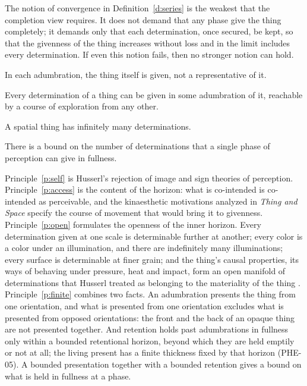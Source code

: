 \documentclass{situationist-preprint}
\begin{document}
The notion of convergence in Definition~\ref{d:series} is the weakest that the completion view requires. It does not demand that any phase give the thing completely; it demands only that each determination, once secured, be kept, so that the givenness of the thing increases without loss and in the limit includes every determination. If even this notion fails, then no stronger notion can hold.

\begin{principle}\label{p:self}
In each adumbration, the thing itself is given, not a representative of it.
\end{principle}

\begin{principle}\label{p:access}
Every determination of a thing can be given in some adumbration of it, reachable by a course of exploration from any other.
\end{principle}

\begin{principle}\label{p:open}
A spatial thing has infinitely many determinations.
\end{principle}

\begin{principle}\label{p:finite}
There is a bound on the number of determinations that a single phase of perception can give in fullness.
\end{principle}

Principle~\ref{p:self} is Husserl's rejection of image and sign theories of perception. Principle~\ref{p:access} is the content of the horizon: what is co-intended is co-intended as perceivable, and the kinaesthetic motivations analyzed in \emph{Thing and Space} specify the course of movement that would bring it to givenness. Principle~\ref{p:open} formulates the openness of the inner horizon. Every determination given at one scale is determinable further at another; every color is a color under an illumination, and there are indefinitely many illuminations; every surface is determinable at finer grain; and the thing's causal properties, its ways of behaving under pressure, heat and impact, form an open manifold of determinations that Husserl treated as belonging to the materiality of the thing \citep{Husserl1952}. Principle~\ref{p:finite} combines two facts. An adumbration presents the thing from one orientation, and what is presented from one orientation excludes what is presented from opposed orientations: the front and the back of an opaque thing are not presented together. And retention holds past adumbrations in fullness only within a bounded retentional horizon, beyond which they are held emptily or not at all; the living present has a finite thickness fixed by that horizon (PHE-05). A bounded presentation together with a bounded retention gives a bound on what is held in fullness at a phase.
\end{document}
